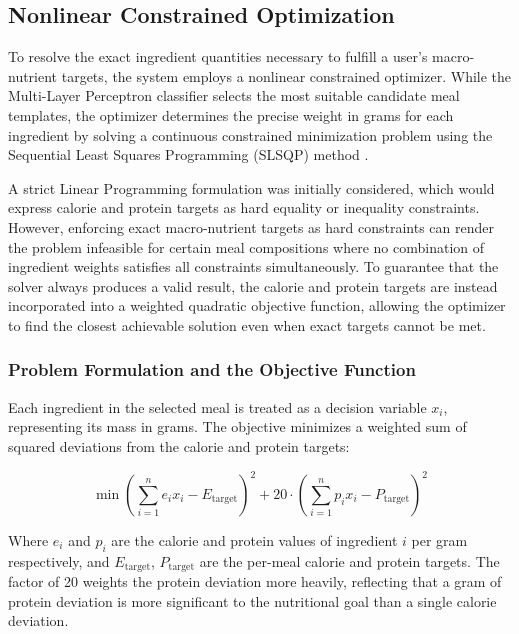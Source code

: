 \subsection{Nonlinear Constrained Optimization}

To resolve the exact ingredient quantities necessary to fulfill a user's
macro-nutrient targets, the system employs a nonlinear constrained optimizer.
While the Multi-Layer Perceptron classifier selects the most suitable candidate
meal templates, the optimizer determines the precise weight in grams for each
ingredient by solving a continuous constrained minimization problem using the
Sequential Least Squares Programming (SLSQP) method \cite{art:virtanen:scipy:2020}.

A strict Linear Programming formulation was initially considered, which would
express calorie and protein targets as hard equality or inequality constraints.
However, enforcing exact macro-nutrient targets as hard constraints can render
the problem infeasible for certain meal compositions where no combination of
ingredient weights satisfies all constraints simultaneously. To guarantee that
the solver always produces a valid result, the calorie and protein targets are
instead incorporated into a weighted quadratic objective function, allowing the
optimizer to find the closest achievable solution even when exact targets cannot
be met.

\subsubsection{Problem Formulation and the Objective Function}
Each ingredient in the selected meal is treated as a decision variable $x_i$,
representing its mass in grams. The objective minimizes a weighted sum of squared
deviations from the calorie and protein targets:

\begin{equation}
\min \left( \sum_{i=1}^{n} e_i x_i - E_{\text{target}} \right)^2
+ 20 \cdot \left( \sum_{i=1}^{n} p_i x_i - P_{\text{target}} \right)^2
\end{equation}

Where $e_i$ and $p_i$ are the calorie and protein values of ingredient $i$ per
gram respectively, and $E_{\text{target}}$, $P_{\text{target}}$ are the per-meal
calorie and protein targets. The factor of 20 weights the protein deviation more
heavily, reflecting that a gram of protein deviation is more significant to the
nutritional goal than a single calorie deviation.


